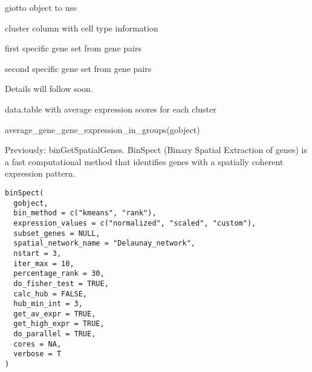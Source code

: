 \documentclass[a4paper]{book}
\begin{document}
%
\begin{Arguments}
\begin{ldescription}
\item[\code{gobject}] giotto object to use

\item[\code{cluster\_column}] cluster column with cell type information

\item[\code{gene\_set\_1}] first specific gene set from gene pairs

\item[\code{gene\_set\_2}] second specific gene set from gene pairs
\end{ldescription}
\end{Arguments}
%
\begin{Details}\relax
Details will follow soon.
\end{Details}
%
\begin{Value}
data.table with average expression scores for each cluster
\end{Value}
%
\begin{Examples}
\begin{ExampleCode}
    average_gene_gene_expression_in_groups(gobject)
\end{ExampleCode}
\end{Examples}
%
\begin{Description}\relax
Previously: binGetSpatialGenes. BinSpect (Binary Spatial Extraction of genes) is a fast computational method
that identifies genes with a spatially coherent expression pattern.
\end{Description}
%
\begin{Usage}
\begin{verbatim}
binSpect(
  gobject,
  bin_method = c("kmeans", "rank"),
  expression_values = c("normalized", "scaled", "custom"),
  subset_genes = NULL,
  spatial_network_name = "Delaunay_network",
  nstart = 3,
  iter_max = 10,
  percentage_rank = 30,
  do_fisher_test = TRUE,
  calc_hub = FALSE,
  hub_min_int = 3,
  get_av_expr = TRUE,
  get_high_expr = TRUE,
  do_parallel = TRUE,
  cores = NA,
  verbose = T
)
\end{verbatim}
\end{Usage}
%
\end{document}

